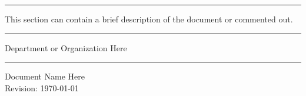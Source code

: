 
	\begin{titlepage}

	\vspace{40pt}

	\rule{\linewidth}{0.5mm}

	\begin{center}
	This section can contain a brief description of the document or commented out.  \\[10pt]
	\end{center}

	\rule{\linewidth}{0.5mm}
	\vspace*{80pt}
	\begin{flushright}
	{\color{Color1}\Large Department or Organization Here}
	\rule{\linewidth}{2mm}
	{\color{Color1}\Huge Document Name Here} \\ 
	{\normalfont Revision: \today }
	\end{flushright}




\end{titlepage}
